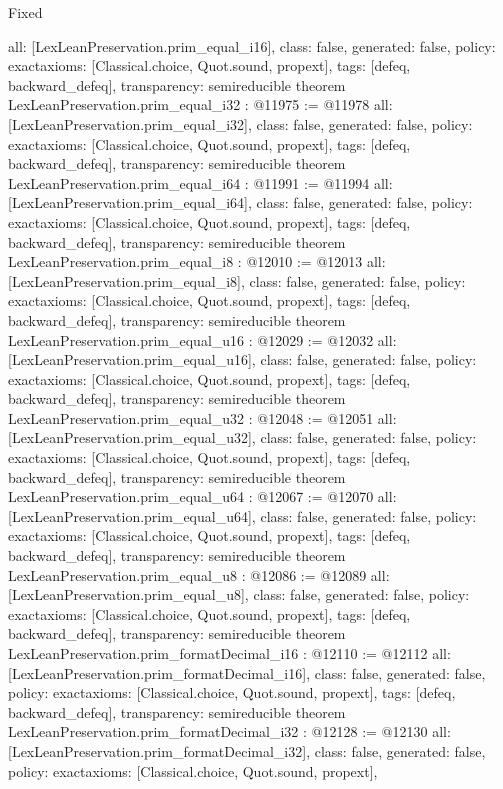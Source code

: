 \begin{lexlean}{Fixed}
\begin{coremodule}
{  all: [LexLeanPreservation.prim_equal_i16],
  class: false,
  generated: false,
  policy: exact{axioms: [Classical.choice, Quot.sound, propext]},
  tags: [defeq, backward_defeq],
  transparency: semireducible
}
theorem LexLeanPreservation.prim_equal_i32 : @11975 := @11978 {
  all: [LexLeanPreservation.prim_equal_i32],
  class: false,
  generated: false,
  policy: exact{axioms: [Classical.choice, Quot.sound, propext]},
  tags: [defeq, backward_defeq],
  transparency: semireducible
}
theorem LexLeanPreservation.prim_equal_i64 : @11991 := @11994 {
  all: [LexLeanPreservation.prim_equal_i64],
  class: false,
  generated: false,
  policy: exact{axioms: [Classical.choice, Quot.sound, propext]},
  tags: [defeq, backward_defeq],
  transparency: semireducible
}
theorem LexLeanPreservation.prim_equal_i8 : @12010 := @12013 {
  all: [LexLeanPreservation.prim_equal_i8],
  class: false,
  generated: false,
  policy: exact{axioms: [Classical.choice, Quot.sound, propext]},
  tags: [defeq, backward_defeq],
  transparency: semireducible
}
theorem LexLeanPreservation.prim_equal_u16 : @12029 := @12032 {
  all: [LexLeanPreservation.prim_equal_u16],
  class: false,
  generated: false,
  policy: exact{axioms: [Classical.choice, Quot.sound, propext]},
  tags: [defeq, backward_defeq],
  transparency: semireducible
}
theorem LexLeanPreservation.prim_equal_u32 : @12048 := @12051 {
  all: [LexLeanPreservation.prim_equal_u32],
  class: false,
  generated: false,
  policy: exact{axioms: [Classical.choice, Quot.sound, propext]},
  tags: [defeq, backward_defeq],
  transparency: semireducible
}
theorem LexLeanPreservation.prim_equal_u64 : @12067 := @12070 {
  all: [LexLeanPreservation.prim_equal_u64],
  class: false,
  generated: false,
  policy: exact{axioms: [Classical.choice, Quot.sound, propext]},
  tags: [defeq, backward_defeq],
  transparency: semireducible
}
theorem LexLeanPreservation.prim_equal_u8 : @12086 := @12089 {
  all: [LexLeanPreservation.prim_equal_u8],
  class: false,
  generated: false,
  policy: exact{axioms: [Classical.choice, Quot.sound, propext]},
  tags: [defeq, backward_defeq],
  transparency: semireducible
}
theorem LexLeanPreservation.prim_formatDecimal_i16 : @12110 := @12112 {
  all: [LexLeanPreservation.prim_formatDecimal_i16],
  class: false,
  generated: false,
  policy: exact{axioms: [Classical.choice, Quot.sound, propext]},
  tags: [defeq, backward_defeq],
  transparency: semireducible
}
theorem LexLeanPreservation.prim_formatDecimal_i32 : @12128 := @12130 {
  all: [LexLeanPreservation.prim_formatDecimal_i32],
  class: false,
  generated: false,
  policy: exact{axioms: [Classical.choice, Quot.sound, propext]},
}
\end{coremodule}
\end{lexlean}
